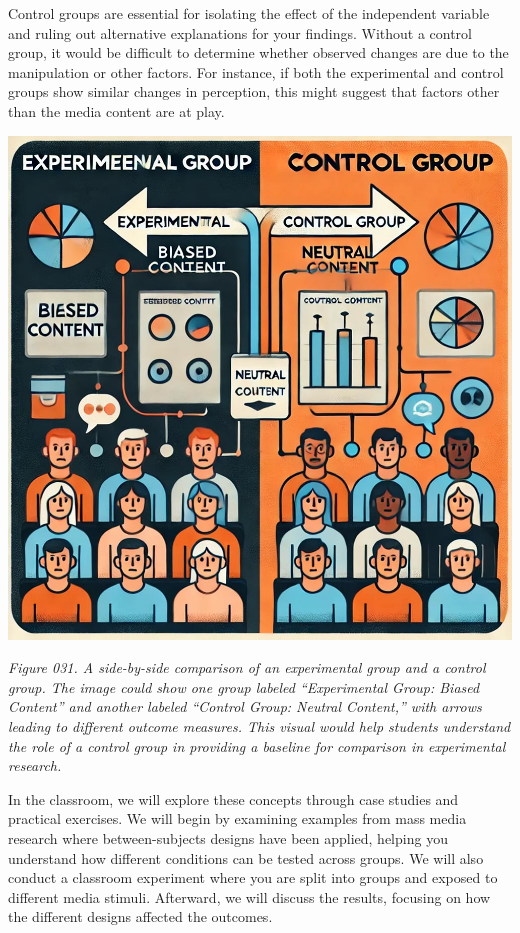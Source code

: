 \documentclass[
]{book}
\begin{document}
Control groups are essential for isolating the effect of the independent variable and ruling out alternative explanations for your findings. Without a control group, it would be difficult to determine whether observed changes are due to the manipulation or other factors. For instance, if both the experimental and control groups show similar changes in perception, this might suggest that factors other than the media content are at play.

\includegraphics[width=1\linewidth,height=\textheight,keepaspectratio]{images/fig031.jpg}

\emph{Figure 031. A side-by-side comparison of an experimental group and a control group. The image could show one group labeled ``Experimental Group: Biased Content'' and another labeled ``Control Group: Neutral Content,'' with arrows leading to different outcome measures. This visual would help students understand the role of a control group in providing a baseline for comparison in experimental research.}

In the classroom, we will explore these concepts through case studies and practical exercises. We will begin by examining examples from mass media research where between-subjects designs have been applied, helping you understand how different conditions can be tested across groups. We will also conduct a classroom experiment where you are split into groups and exposed to different media stimuli. Afterward, we will discuss the results, focusing on how the different designs affected the outcomes.
\end{document}
